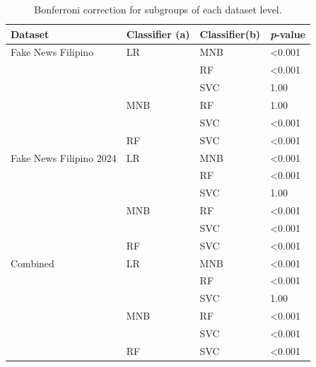 \begin{table}[ht]
    \centering
    \begin{tabular}{|l|l|l|l|}
        \hline Dataset & Classifier (a) & Classifier(b) & \textit{p}-value \\ \hline
        Fake News Filipino & LR & MNB & \textless 0.001 \\
        \cline{3-4}
        & & RF & \textless 0.001 \\
        \cline{3-4}
        & & SVC & 1.00 \\
        \cline{2-4}
        & MNB & RF & 1.00 \\
        \cline{3-4}
        & & SVC & \textless 0.001 \\
        \cline{2-4}
        & RF & SVC & \textless 0.001 \\
        \hline
        Fake News Filipino 2024 & LR & MNB & \textless 0.001 \\
        \cline{3-4}
        & & RF & \textless 0.001 \\
        \cline{3-4}
        & & SVC & 1.00 \\
        \cline{2-4}
        & MNB & RF & \textless 0.001 \\
        \cline{3-4}
        & & SVC & \textless 0.001 \\
        \cline{2-4}
        & RF & SVC & \textless 0.001 \\
        \hline
        Combined & LR & MNB & \textless 0.001 \\
        \cline{3-4}
        & & RF & \textless 0.001 \\
        \cline{3-4}
        & & SVC & 1.00 \\
        \cline{2-4}
        & MNB & RF & \textless 0.001 \\
        \cline{3-4}
        & & SVC & \textless 0.001 \\
        \cline{2-4}
        & RF & SVC & \textless 0.001\\
        \hline
    
    \end{tabular}
\caption{Bonferroni correction for subgroups of each dataset level.}
\label{tab::post-hoc-dataset-lvl}
\end{table}


